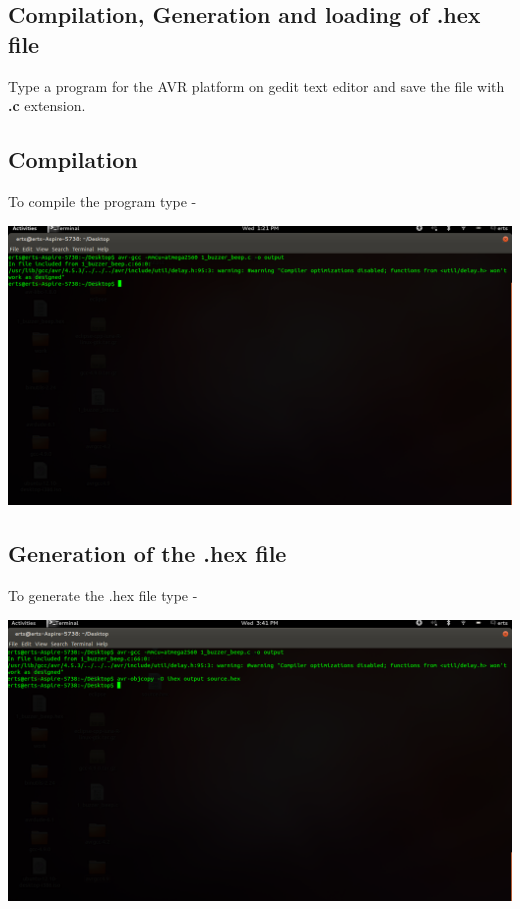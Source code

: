 \begin{flushleft}
\medskip

\section{\textbf{Compilation, Generation and loading of .hex file}}

Type a program for the AVR platform on gedit text editor and save the file with \textbf{.c} extension.

\subsection{Compilation}

\medskip

To compile the program type - 

\medskip


\medskip

\includegraphics[scale=0.3]{f23}

\medskip

\subsection{Generation of the .hex file}

\medskip

To generate the .hex file type - 

\medskip


\medskip

\includegraphics[scale=0.3]{f24}


\end{flushleft}
